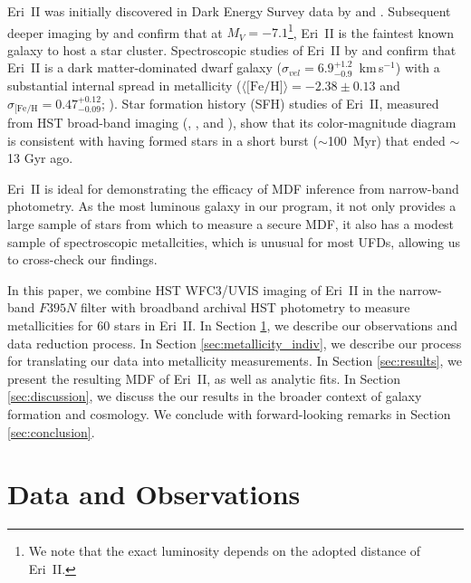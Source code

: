 \documentclass[twocolumn]{aastex63}
\newcommand{\kms}   {km\,s$^{-1}$}
\begin{document}
\par Eri~II was initially discovered in Dark Energy Survey data by \citet{bechtol2015DESsat} and \citet{koposov2015DESsat}. Subsequent deeper imaging by \citet{crnojevic2016eriII} and \citep{munoz2018structural} confirm that at  $M_V=-7.1$\footnote{We note that the exact luminosity depends on the adopted distance of Eri~II.}, Eri~II is the faintest known galaxy to host a star cluster. Spectroscopic studies of Eri~II by \citet[][16 stars on Magellan/IMACS]{li2017eriII} and \citet[][26 stars on VLT/MUSE]{zoutendijk2020eriII} confirm that Eri~II is a dark matter-dominated dwarf galaxy ($\sigma_{vel}=6.9^{+1.2}_{-0.9}$~\kms) with a substantial internal spread in metallicity ($\langle \mbox{[Fe/H]} \rangle=-2.38\pm0.13$ and $\sigma_{\mbox{[Fe/H}}=0.47^{+0.12}_{-0.09}$; \citealt{li2017eriII}). Star formation history (SFH) studies of Eri~II, measured from HST broad-band imaging (\citealt{simon2021EriII}, \citealt{gallart2021eriii}, and \citealt{alzate2021eriii}), show that its color-magnitude diagram is consistent with having formed stars in a short burst ($\sim$100~Myr) that ended $\sim$13 Gyr ago. 

\par Eri~II is ideal for demonstrating the efficacy of MDF inference from narrow-band photometry. As the most luminous galaxy in our program, it not only provides a large sample of stars from which to measure a secure MDF, it also has a modest sample of spectroscopic metallcities, which is unusual for most UFDs, allowing us to cross-check our findings.

\par In this paper, we combine HST WFC3/UVIS imaging of Eri~II in the narrow-band $F395N$ filter with broadband archival HST photometry to measure metallicities for 60 stars in Eri~II. In Section \ref{sec:data}, we describe our observations and data reduction process. In Section \ref{sec:metallicity_indiv}, we describe our process for translating our data into metallicity measurements. In Section \ref{sec:results}, we present the resulting MDF of Eri~II, as well as analytic fits. In Section \ref{sec:discussion}, we discuss the our results in the broader context of galaxy formation and cosmology. We conclude with forward-looking remarks in Section \ref{sec:conclusion}. 


\section{Data and Observations} 
\label{sec:data}
\end{document}
